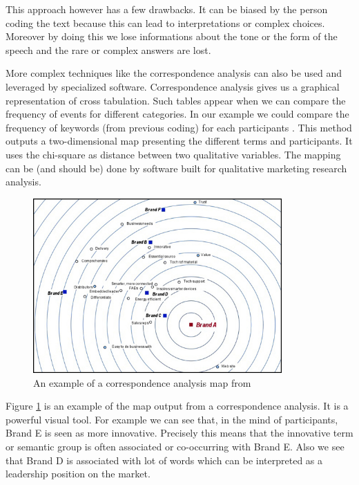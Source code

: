\documentclass[10pt]{report}
\begin{document}
This approach however has a few drawbacks. It can be biased by the person coding the text because this can lead to interpretations or complex choices. Moreover by doing this we lose informations about the tone or the form of the speech and the rare or complex answers are lost. 

More complex techniques like the correspondence analysis can also be used and leveraged by specialized software. Correspondence analysis gives us a graphical representation of cross tabulation. Such tables appear when we can compare the frequency of events for different categories. In our example we could compare the frequency of keywords (from previous coding) for each participants \autocite{yelland2010correspondence}. This method outputs a two-dimensional map presenting the different terms and participants. It uses the chi-square as distance between two qualitative variables. The mapping can be (and should be) done by software built for qualitative marketing research analysis.

\begin{figure}[h!]
\centering
\includegraphics[width=0.85\textwidth]{AFCex.jpg}
\caption{An example of a correspondence analysis map from \autocite{AFCwebsite}}
\label{AFCexample}
\end{figure}

Figure \ref{AFCexample} is an example of the map output from a correspondence analysis. It is a powerful visual tool. For example we can see that, in the mind of participants, Brand E is seen as more innovative. Precisely this means that the innovative term or semantic group is often associated or co-occurring with Brand E. Also we see that Brand D is associated with lot of words which can be interpreted as a leadership position on the market.
\end{document}
